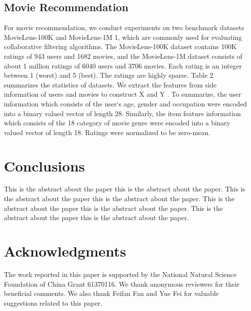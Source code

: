 \documentclass{sig-alternate-05-2015}
\begin{document}
\subsection{Movie Recommendation}
For movie recommendation, we conduct experiments on two benchmark
datasets MovieLens-100K and MovieLens-1M 1, which are
commonly used for evaluating collaborative filtering algorithms.
The MovieLens-100K dataset contains 100K ratings of 943 users
and 1682 movies, and the MovieLens-1M dataset consists of about
1 million ratings of 6040 users and 3706 movies. Each rating is
an integer between 1 (worst) and 5 (best). The ratings are highly
sparse. Table 2 summarizes the statistics of datasets. We extract
the features from side information of users and movies to construct
X and Y . To summarize, the user information which consists of
the user‘s age, gender and occupation were encoded into a binary
valued vector of length 28. Similarly, the item feature information
which consists of the 18 category of movie genre were encoded into
a binary valued vector of length 18. Ratings were normalized to be
zero-mean.

\section{Conclusions}
This is the abstract about the paper this is the abstract about the paper.
This is the abstract about the paper this is the abstract about the paper.
This is the abstract about the paper this is the abstract about the paper.
This is the abstract about the paper this is the abstract about the paper.

\section{Acknowledgments}
The work reported in this paper is supported by the National Natural Science Foundation of China Grant 61370116.
We thank anonymous reviewers for their beneficial comments.
We also thank Feifan Fan and Yue Fei for valuable suggestions related to this paper.



\end{document}
